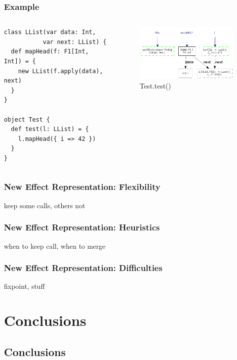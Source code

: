 \documentclass[hyperref={pdfpagelabels=false}]{beamer}
\begin{document}
\begin{frame}[fragile]
\frametitle{Example}
  \begin{columns}
    \begin{column}{0.4\textwidth}
\begin{lstlisting}[escapechar=\%]
class LList(var data: Int,
           var next: LList) {
  def mapHead(f: F1[Int, Int]) = {
    new LList(f.apply(data), next)
  }
}

object Test {
  def test(l: LList) = {
    l.mapHead({ i => 42 })
  }
}
\end{lstlisting}
    \end{column}
    \begin{column}{0.6\textwidth}
      \begin{figure}[t]
        \begin{center}
        \includegraphics[width=60mm]{images/e5.png}\\
        Test.test()
        \end{center}
      \end{figure}
    \end{column}
  \end{columns}
\end{frame}

\begin{frame}[fragile]
\frametitle{New Effect Representation: Flexibility}
    keep some calls, others not
\end{frame}

\begin{frame}[fragile]
\frametitle{New Effect Representation: Heuristics}
    when to keep call, when to merge
\end{frame}

\begin{frame}[fragile]
\frametitle{New Effect Representation: Difficulties}
    fixpoint, stuff
\end{frame}

\section{Conclusions}
\subsection{Conclusions}
\end{document}
